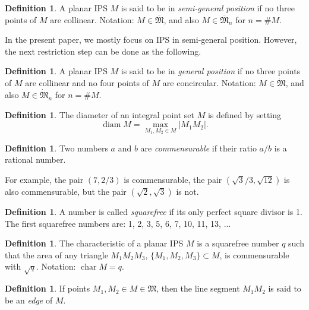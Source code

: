 \documentclass[a4paper,14pt]{article} %
\theoremstyle{plain}
\theoremstyle{definition}
\newtheorem{definition}[theorem]{Definition}
\DeclareMathOperator{\chr}{char}
\begin{document}
\begin{definition}
	\label{def:IPS_semi_general}
	A planar IPS $M$ is said to be in \emph{semi-general position}
	if no three points of $M$ are collinear.
	Notation: $M\in\overline{\mathfrak{M}}$, and also $M\in\overline{\mathfrak{M}}_n$ for $n=\#M$.
\end{definition}

In the present paper, we mostly focus on IPS in semi-general position.
However, the next restriction step can be done as the following.

\begin{definition}
	\label{def:IPS_general}
	A planar IPS $M$ is said to be in \emph{general position}
	if no three points of $M$ are collinear
	and no four points of $M$ are concircular.
	Notation: $M\in\dot{\mathfrak{M}}$, and also $M\in\dot{\mathfrak{M}}_n$ for $n=\#M$.
\end{definition}

\begin{definition}
	The diameter of an integral point set $M$ is defined by setting
	\begin{equation}
		\operatorname{diam} M = \underset{M_{1}, M_{2} \in
		M}{\max} |M_{1}M_{2}|
		.
	\end{equation}
\end{definition}

\begin{definition}
	Two numbers $a$ and $b$ are \emph{commensurable} if their ratio $a/b$
	is a rational number.
\end{definition}

For example, the pair $(7, 2/3)$ is commensurable,
the pair $(\sqrt3/3, \sqrt{12})$ is also commensurable,
but the pair $(\sqrt2, \sqrt3)$ is not.

\begin{definition}
	A number is called \emph{squarefree} if its only perfect square divisor is 1.
	The first squarefree numbers are: 1, 2, 3, 5, 6, 7, 10, 11, 13, ...
\end{definition}


\begin{definition}
	\label{def:char}
	The characteristic of a planar IPS $M$ is a squarefree number $q$
	such that the area of any triangle $M_1M_2M_3$, $\{M_1,M_2,M_3\}\subset M$,
	is commensurable with $\sqrt{q}$.
	Notation: $\chr M = q$.
\end{definition}

\begin{definition}
	If points $M_1, M_2 \in M \in \mathfrak{M}$,
	then the line segment $M_1 M_2$ is said to be an \emph{edge} of $M$.
\end{definition}
\end{document}
